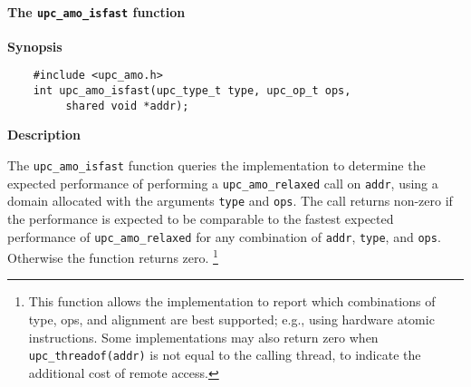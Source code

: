 \paragraph{The {\tt upc\_amo\_isfast} function}

{\bf Synopsis}

\npf\vspace{-1.8em}
\begin{verbatim}
    #include <upc_amo.h>
    int upc_amo_isfast(upc_type_t type, upc_op_t ops,
         shared void *addr);
\end{verbatim}

{\bf Description}

\np The {\tt upc\_amo\_isfast} function queries the implementation to determine
    the expected performance of performing a {\tt upc\_amo\_relaxed} call on
    {\tt addr}, using a domain allocated with the arguments {\tt type} and
    {\tt ops}.  The call returns non-zero if the performance is expected to be
    comparable to the fastest expected performance of {\tt upc\_amo\_relaxed}
    for any combination of {\tt addr}, {\tt type}, and {\tt ops}.  Otherwise
    the function returns zero.%
    \footnote{This function allows the implementation to report which
    combinations of type, ops, and alignment are best supported; e.g., using
    hardware atomic instructions.  Some implementations may also return zero
    when {\tt upc\_threadof(addr)} is not equal to the calling thread, to
    indicate the additional cost of remote access.}
